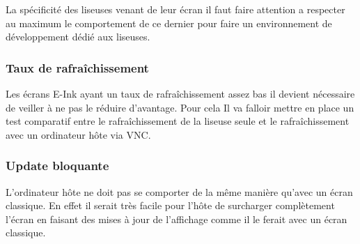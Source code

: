 La spécificité des liseuses venant de leur écran il faut faire attention a respecter au maximum le comportement de ce dernier pour faire un environnement de développement dédié aux liseuses.

\subsubsection{Taux de rafraîchissement}

Les écrans E-Ink ayant un taux de rafraîchissement assez bas il devient nécessaire de veiller à ne pas le réduire d'avantage.
Pour cela Il va falloir mettre en place un test comparatif entre le rafraîchissement de la liseuse seule et le rafraîchissement avec un ordinateur hôte via VNC.

\subsubsection{Update bloquante}

L'ordinateur hôte ne doit pas se comporter de la même manière qu'avec un écran classique. En effet il serait très facile pour l'hôte de surcharger complètement l'écran en faisant des mises à jour de l'affichage comme il le ferait avec un écran classique. %
